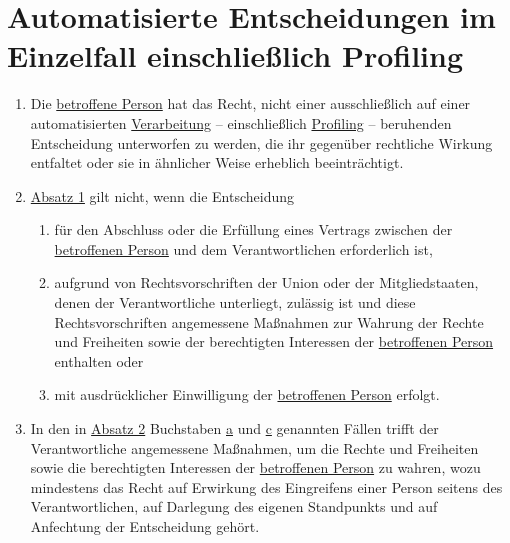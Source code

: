 \chapter{Automatisierte Entscheidungen im Einzelfall einschließlich Profiling}
\label{ch:22}


\begin{enumerate}

  \item Die \hyperref[itm:04-1]{betroffene Person} hat das Recht, nicht einer ausschließlich auf einer automatisierten \hyperref[itm:04-2]{Verarbeitung} --
   einschließlich \hyperref[itm:04-4]{Profiling} -- beruhenden Entscheidung unterworfen zu werden, die ihr gegenüber rechtliche Wirkung
   entfaltet oder sie in ähnlicher Weise erheblich beeinträchtigt.
  \label{itm:22-1}

  \item \hyperref[itm:22-1]{Absatz 1} gilt nicht, wenn die Entscheidung
  \label{itm:22-2}

  \begin{enumerate}
  
    \item für den Abschluss oder die Erfüllung eines Vertrags zwischen der \hyperref[itm:04-1]{betroffenen Person} und dem Verantwortlichen
     erforderlich ist,
    \label{itm:22-2a}

    \item aufgrund von Rechtsvorschriften der Union oder der Mitgliedstaaten, denen der Verantwortliche unterliegt,
     zulässig ist und diese Rechtsvorschriften angemessene Maßnahmen zur Wahrung der Rechte und Freiheiten sowie der
     berechtigten Interessen der \hyperref[itm:04-1]{betroffenen Person} enthalten oder
    \label{itm:22-2b}

    \item mit ausdrücklicher Einwilligung der \hyperref[itm:04-1]{betroffenen Person} erfolgt.
    \label{itm:22-2c}

  \end{enumerate}

  \item In den in \hyperref[itm:22-2]{Absatz 2} Buchstaben \hyperref[itm:22-2a]{a} und \hyperref[itm:22-2c]{c} genannten
   Fällen trifft der Verantwortliche angemessene Maßnahmen, um die Rechte und Freiheiten sowie die berechtigten
   Interessen der \hyperref[itm:04-1]{betroffenen Person} zu wahren, wozu mindestens das Recht auf Erwirkung des Eingreifens einer Person
   seitens des Verantwortlichen, auf Darlegung des eigenen Standpunkts und auf Anfechtung der Entscheidung gehört.
  \label{itm:22-3}


\end{enumerate}
